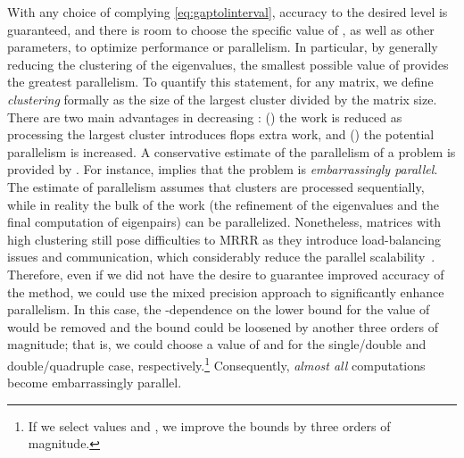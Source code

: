 \documentclass[final]{siamltex}
\begin{document}
 With any choice of  complying \eqref{eq:gaptolinterval}, accuracy
 to the desired level is guaranteed, and there is room to choose the specific
 value of , as well as other parameters, to optimize performance or
 parallelism. In particular, by generally reducing the clustering of the
 eigenvalues, the smallest possible value of  provides the greatest parallelism.
 To quantify this statement, for any matrix, we
 define {\it clustering}  formally as the size of the
 largest cluster divided by the matrix size. There are two main advantages
 in decreasing : () the work is reduced as processing the
 largest cluster introduces  
 flops extra work, and () the potential parallelism is increased. A conservative
 estimate of the parallelism of a problem is provided by . For instance,  implies that the problem is {\it embarrassingly parallel}. The
 estimate of parallelism assumes that clusters are processed sequentially,
 while in reality the bulk of the work (the refinement of the eigenvalues and
 the final computation of eigenpairs) can be
 parallelized. Nonetheless, matrices with high clustering still pose
 difficulties to MRRR as they introduce load-balancing issues and
 communication, which considerably reduce the parallel
 scalability~\cite{Vomel:2010:ScaLAPACKsMRRR,VoemelRefinedTree2007tr,mydiss}. 
 Therefore, even if we did not have the desire to guarantee improved accuracy of
 the method, we could use the mixed precision approach to significantly
 enhance parallelism. In this case, the -dependence on the lower
 bound for the value of  would be removed and the bound could be
 loosened by another three orders of magnitude; that is, we could choose a value of
  and  for the single/double and double/quadruple case,
 respectively.\footnote{If we select values  and , we improve the bounds by three orders of magnitude.} Consequently, {\it almost
 all} computations become embarrassingly parallel. 
\end{document}

